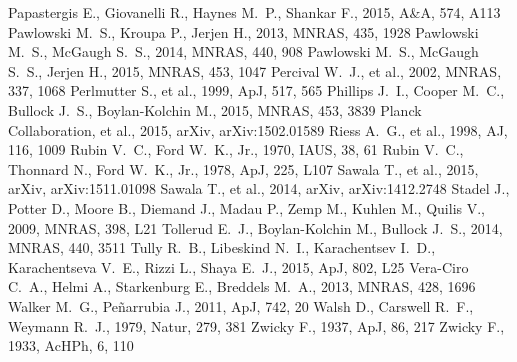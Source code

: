 \documentclass[a4wide,12pt]{book}
\begin{document}
\begin{thebibliography}{}
 Papastergis E., Giovanelli R., Haynes M.~P., Shankar F., 2015, A\&A, 574, A113 
 Pawlowski M.~S., Kroupa P., Jerjen H., 2013, MNRAS, 435, 1928 
 Pawlowski M.~S., McGaugh S.~S., 2014, MNRAS, 440, 908 
 Pawlowski M.~S., McGaugh S.~S., Jerjen H., 2015, MNRAS, 453, 1047 
 Percival W.~J., et al., 2002, MNRAS, 337, 
1068 
 Perlmutter S., et al., 1999, ApJ, 517, 565 
 Phillips J.~I., Cooper M.~C., Bullock 
J.~S., Boylan-Kolchin M., 2015, MNRAS, 453, 3839 
 Planck Collaboration, et al., 2015, arXiv, 
arXiv:1502.01589 
Riess A.~G., et al., 1998, AJ, 116, 1009 
 Rubin V.~C., Ford W.~K., Jr., 1970, IAUS, 38, 61
 Rubin V.~C., Thonnard N., Ford W.~K., Jr., 1978, ApJ, 225, L107 
Sawala T., et al., 2015, arXiv, arXiv:1511.01098 
Sawala T., et al., 2014, arXiv, arXiv:1412.2748 
Stadel J., Potter D., Moore B., Diemand J., Madau P., Zemp M., Kuhlen M., 
Quilis V., 2009, MNRAS, 398, L21 
 Tollerud E.~J., Boylan-Kolchin M., Bullock J.~S., 2014, MNRAS, 440, 3511 
Tully R.~B., Libeskind N.~I., Karachentsev I.~D., Karachentseva V.~E., 
Rizzi L., Shaya E.~J., 2015, ApJ, 802, L25
 Vera-Ciro C.~A., Helmi A., Starkenburg E., 
Breddels M.~A., 2013, MNRAS, 428, 1696 
 Walker M.~G., Pe{\~n}arrubia J., 2011, ApJ, 742, 20  
 Walsh D., Carswell R.~F., Weymann R.~J., 1979, Natur, 279, 381 
 Zwicky 
F., 1937, ApJ, 86, 217 
 Zwicky 
F., 1933, AcHPh, 6, 110
\end{thebibliography}

\end{document}
